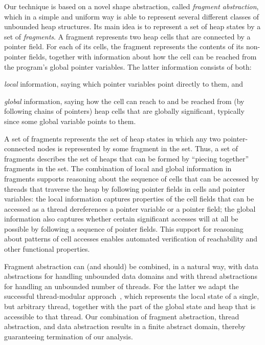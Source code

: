 Our technique is based on a novel shape abstraction,
called {\em fragment abstraction}, which in a simple and uniform way is able to
represent several different classes of unbounded heap structures.
Its main idea is to represent a set of heap states by a set of {\em fragments}.
A fragment represents two heap cells that are connected by a pointer field.
For each of its cells, 
the fragment represents the contents of its non-pointer fields, together with
information about how the cell can be reached from the program's global pointer
variables. The latter information consists of both:
\begin{inparaenum}[(i)]
  \item {\em local} information, saying which pointer variables
    point directly to them, and
    \item {\em global} information, saying how the cell
      can reach to and be reached from (by following chains of pointers)
      heap cells that are globally significant, typically since
      some global variable points to them.
\end{inparaenum}
A set of fragments represents the set of heap states
in which any two pointer-connected nodes is represented by some
fragment in the set.
Thus, a set of fragments describes the set of heaps that can be formed by
``piecing together'' fragments in the set.
The combination of local and global information in fragments supports
reasoning about the sequence of cells that can be accessed by
threads that traverse the heap by following pointer fields in cells and
pointer variables:
the local information captures properties of the cell fields that can
be accessed as a thread dereferences a pointer variable or a pointer field;
the global information also captures whether certain significant accesses
will at all be possible by following a sequence of pointer fields.
This support for reasoning about patterns of cell accesses enables
automated verification of reachability and other functional properties.

Fragment abstraction can (and should) be combined, in a natural way,
with data abstractions for
handling unbounded data domains and with thread abstractions
for handling an unbounded number of threads.
For the latter we adapt
the successful thread-modular approach~\cite{BLMRS:cav08}, which
represents the local state of a single, but arbitrary thread, together
with the part of the global state and heap that is accessible to that thread.
Our combination of fragment abstraction, thread abstraction, and data
abstraction results in a finite abstract domain, thereby guaranteeing
termination of our analysis.

